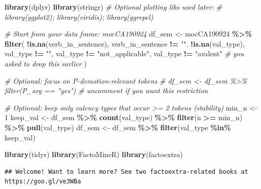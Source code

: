\documentclass[
]{article}
\newenvironment{Shaded}{\begin{snugshade}}{\end{snugshade}}
\newcommand{\CommentTok}[1]{\textcolor[rgb]{0.56,0.35,0.01}{\textit{#1}}}
\newcommand{\DecValTok}[1]{\textcolor[rgb]{0.00,0.00,0.81}{#1}}
\newcommand{\FunctionTok}[1]{\textcolor[rgb]{0.13,0.29,0.53}{\textbf{#1}}}
\newcommand{\NormalTok}[1]{#1}
\newcommand{\OtherTok}[1]{\textcolor[rgb]{0.56,0.35,0.01}{#1}}
\newcommand{\SpecialCharTok}[1]{\textcolor[rgb]{0.81,0.36,0.00}{\textbf{#1}}}
\newcommand{\StringTok}[1]{\textcolor[rgb]{0.31,0.60,0.02}{#1}}
\begin{document}
\begin{Shaded}
\begin{Highlighting}[]
\FunctionTok{library}\NormalTok{(dplyr)}
\FunctionTok{library}\NormalTok{(stringr)}
\CommentTok{\# Optional plotting libs used later:}
\CommentTok{\# library(ggplot2); library(viridis); library(ggrepel)}

\CommentTok{\# Start from your data frame: mocCA190924}
\NormalTok{df\_sem }\OtherTok{\textless{}{-}}\NormalTok{ mocCA190924 }\SpecialCharTok{\%\textgreater{}\%}
  \FunctionTok{filter}\NormalTok{(}
    \SpecialCharTok{!}\FunctionTok{is.na}\NormalTok{(verb\_in\_sentence), verb\_in\_sentence }\SpecialCharTok{!=} \StringTok{""}\NormalTok{,}
    \SpecialCharTok{!}\FunctionTok{is.na}\NormalTok{(val\_type), val\_type }\SpecialCharTok{!=} \StringTok{""}\NormalTok{, val\_type }\SpecialCharTok{!=} \StringTok{"not\_applicable"}\NormalTok{,}
\NormalTok{    val\_type }\SpecialCharTok{!=} \StringTok{"avalent"}                       \CommentTok{\# you asked to drop this earlier}
\NormalTok{  )}

\CommentTok{\# Optional: focus on P{-}demotion{-}relevant tokens}
\CommentTok{\# df\_sem \textless{}{-} df\_sem \%\textgreater{}\% filter(P\_arg == "yes")   \# uncomment if you want this restriction}

\CommentTok{\# Optional: keep only valency types that occur \textgreater{}= 2 tokens (stability)}
\NormalTok{min\_n }\OtherTok{\textless{}{-}} \DecValTok{1}
\NormalTok{keep\_val }\OtherTok{\textless{}{-}}\NormalTok{ df\_sem }\SpecialCharTok{\%\textgreater{}\%} \FunctionTok{count}\NormalTok{(val\_type) }\SpecialCharTok{\%\textgreater{}\%} \FunctionTok{filter}\NormalTok{(n }\SpecialCharTok{\textgreater{}=}\NormalTok{ min\_n) }\SpecialCharTok{\%\textgreater{}\%} \FunctionTok{pull}\NormalTok{(val\_type)}
\NormalTok{df\_sem }\OtherTok{\textless{}{-}}\NormalTok{ df\_sem }\SpecialCharTok{\%\textgreater{}\%} \FunctionTok{filter}\NormalTok{(val\_type }\SpecialCharTok{\%in\%}\NormalTok{ keep\_val)}

\FunctionTok{library}\NormalTok{(tidyr)}
\FunctionTok{library}\NormalTok{(FactoMineR)}
\FunctionTok{library}\NormalTok{(factoextra)}
\end{Highlighting}
\end{Shaded}

\begin{verbatim}
## Welcome! Want to learn more? See two factoextra-related books at https://goo.gl/ve3WBa
\end{verbatim}
\end{document}
